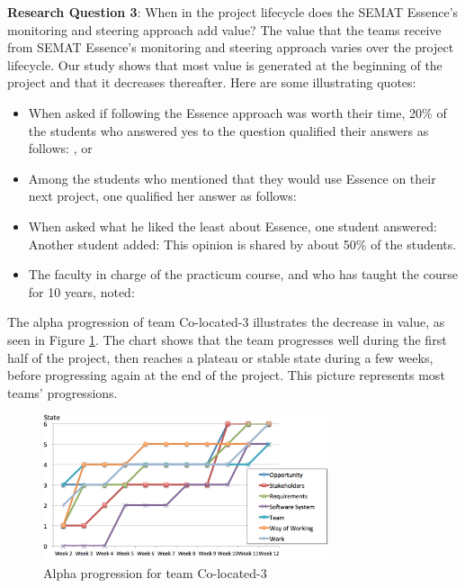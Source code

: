 \textbf{Research Question 3}: When in the project lifecycle does the SEMAT Essence's monitoring and steering approach add value?
The value that the teams receive from SEMAT Essence's monitoring and steering approach varies over the project lifecycle. Our study shows that most value is generated at the beginning of the project and that it decreases thereafter. Here are some illustrating quotes:
\begin{itemize}
    \item When asked if following the Essence approach was worth their time, 20\% of the students who answered yes to the question qualified their answers as follows: , or 
    
    \item Among the students who mentioned that they would use Essence on their next project, one qualified her answer as follows: 
    
    \item When asked what he liked the least about Essence, one student answered:  Another student added:  This opinion is shared by about 50\% of the students.
    
    \item The faculty in charge of the practicum course, and who has taught the course for 10 years, noted: 
\end{itemize}

The alpha progression of team Co-located-3 illustrates the decrease in value, as seen in Figure \ref{AlphaProgressionColocated3}. The chart shows that the team progresses well during the first half of the project, then reaches a plateau or stable state during a few weeks, before progressing again at the end of the project. This picture represents most teams' progressions.

\begin{figure}[t]
\centering
\includegraphics[width=3.30in]{project_steering_images/AlphaProgressionColocated3.png}
\caption{Alpha progression for team Co-located-3}
\label{AlphaProgressionColocated3}
\end{figure}


